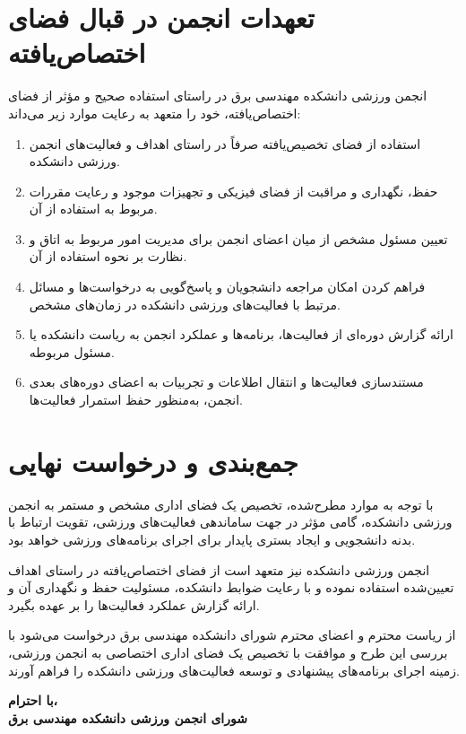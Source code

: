 \documentclass[12pt,a4paper]{article}
\newcommand{\SenderCouncilTitle}{شورای انجمن ورزشی دانشکده مهندسی برق}
\begin{document}
\section{تعهدات انجمن در قبال فضای اختصاص‌یافته}
انجمن ورزشی دانشکده مهندسی برق در راستای استفاده صحیح و مؤثر از فضای اختصاص‌یافته، خود را متعهد به رعایت موارد زیر می‌داند:
\begin{enumerate}
    \item استفاده از فضای تخصیص‌یافته صرفاً در راستای اهداف و فعالیت‌های انجمن ورزشی دانشکده.
    \item حفظ، نگهداری و مراقبت از فضای فیزیکی و تجهیزات موجود و رعایت مقررات مربوط به استفاده از آن.
    \item تعیین مسئول مشخص از میان اعضای انجمن برای مدیریت امور مربوط به اتاق و نظارت بر نحوه استفاده از آن.
    \item فراهم کردن امکان مراجعه دانشجویان و پاسخ‌گویی به درخواست‌ها و مسائل مرتبط با فعالیت‌های ورزشی دانشکده در زمان‌های مشخص.
    \item ارائه گزارش دوره‌ای از فعالیت‌ها، برنامه‌ها و عملکرد انجمن به ریاست دانشکده یا مسئول مربوطه.
    \item مستندسازی فعالیت‌ها و انتقال اطلاعات و تجربیات به اعضای دوره‌های بعدی انجمن، به‌منظور حفظ استمرار فعالیت‌ها.
\end{enumerate}

\section{جمع‌بندی و درخواست نهایی}
با توجه به موارد مطرح‌شده، تخصیص یک فضای اداری مشخص و مستمر به انجمن ورزشی دانشکده، گامی مؤثر در جهت ساماندهی فعالیت‌های ورزشی، تقویت ارتباط با بدنه دانشجویی و ایجاد بستری پایدار برای اجرای برنامه‌های ورزشی خواهد بود.

انجمن ورزشی دانشکده نیز متعهد است از فضای اختصاص‌یافته در راستای اهداف تعیین‌شده استفاده نموده و با رعایت ضوابط دانشکده، مسئولیت حفظ و نگهداری آن و ارائه گزارش عملکرد فعالیت‌ها را بر عهده بگیرد.

از ریاست محترم و اعضای محترم شورای دانشکده مهندسی برق درخواست می‌شود با بررسی این طرح و موافقت با تخصیص یک فضای اداری اختصاصی به انجمن ورزشی، زمینه اجرای برنامه‌های پیشنهادی و توسعه فعالیت‌های ورزشی دانشکده را فراهم آورند.

\vspace{0.8cm}
\begin{flushleft}
    \textbf{با احترام،} \\[0.2cm]
    \textbf{\SenderCouncilTitle}
\end{flushleft}
\end{document}
